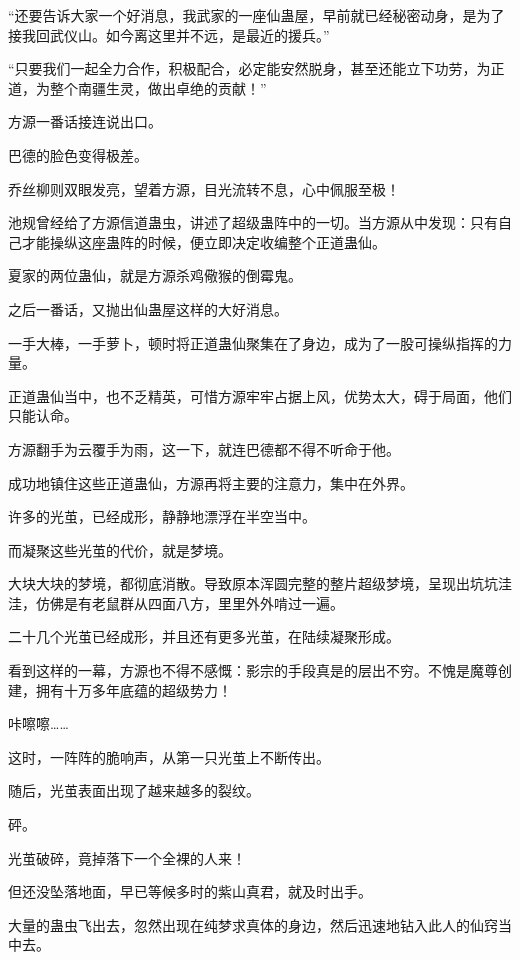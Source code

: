 
\begin{this_body}

“还要告诉大家一个好消息，我武家的一座仙蛊屋，早前就已经秘密动身，是为了接我回武仪山。如今离这里并不远，是最近的援兵。”

“只要我们一起全力合作，积极配合，必定能安然脱身，甚至还能立下功劳，为正道，为整个南疆生灵，做出卓绝的贡献！”

方源一番话接连说出口。

巴德的脸色变得极差。

乔丝柳则双眼发亮，望着方源，目光流转不息，心中佩服至极！

池规曾经给了方源信道蛊虫，讲述了超级蛊阵中的一切。当方源从中发现：只有自己才能操纵这座蛊阵的时候，便立即决定收编整个正道蛊仙。

夏家的两位蛊仙，就是方源杀鸡儆猴的倒霉鬼。

之后一番话，又抛出仙蛊屋这样的大好消息。

一手大棒，一手萝卜，顿时将正道蛊仙聚集在了身边，成为了一股可操纵指挥的力量。

正道蛊仙当中，也不乏精英，可惜方源牢牢占据上风，优势太大，碍于局面，他们只能认命。

方源翻手为云覆手为雨，这一下，就连巴德都不得不听命于他。

成功地镇住这些正道蛊仙，方源再将主要的注意力，集中在外界。

许多的光茧，已经成形，静静地漂浮在半空当中。

而凝聚这些光茧的代价，就是梦境。

大块大块的梦境，都彻底消散。导致原本浑圆完整的整片超级梦境，呈现出坑坑洼洼，仿佛是有老鼠群从四面八方，里里外外啃过一遍。

二十几个光茧已经成形，并且还有更多光茧，在陆续凝聚形成。

看到这样的一幕，方源也不得不感慨：影宗的手段真是的层出不穷。不愧是魔尊创建，拥有十万多年底蕴的超级势力！

咔嚓嚓……

这时，一阵阵的脆响声，从第一只光茧上不断传出。

随后，光茧表面出现了越来越多的裂纹。

砰。

光茧破碎，竟掉落下一个全裸的人来！

但还没坠落地面，早已等候多时的紫山真君，就及时出手。

大量的蛊虫飞出去，忽然出现在纯梦求真体的身边，然后迅速地钻入此人的仙窍当中去。


\end{this_body}
